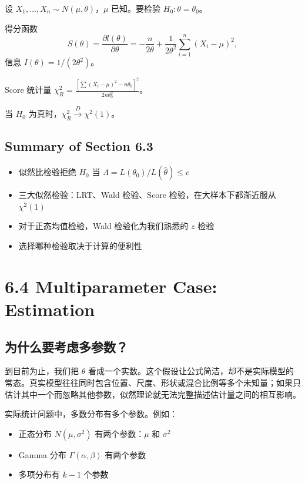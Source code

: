\begin{example}\label{ex:normal-variance-score}
设 $X_1, \ldots, X_n \sim N(\mu, \theta)$，$\mu$ 已知。要检验 $H_0: \theta = \theta_0$。

得分函数
\[
S(\theta)=\frac{\partial l(\theta)}{\partial \theta}
= -\frac{n}{2\theta}+\frac{1}{2\theta^2}\sum_{i=1}^n (X_i-\mu)^2,
\]
信息 $I(\theta)=1/(2\theta^2)$。

Score 统计量 $\chi_R^2 = \frac{[\sum(X_i-\mu)^2 - n\theta_0]^2}{2n\theta_0^2}$。

当 $H_0$ 为真时，$\chi_R^2 \xrightarrow{D} \chi^2(1)$。
\end{example}

\subsection{Summary of Section 6.3}

\begin{itemize}
\item 似然比检验拒绝 $H_0$ 当 $\Lambda = L(\theta_0)/L(\widehat{\theta}) \leq c$
\item 三大似然检验：LRT、Wald 检验、Score 检验，在大样本下都渐近服从 $\chi^2(1)$
\item 对于正态均值检验，Wald 检验化为我们熟悉的 $z$ 检验
\item 选择哪种检验取决于计算的便利性
\end{itemize}

\section{6.4 Multiparameter Case: Estimation}\label{sec:6.4}

\subsection{为什么要考虑多参数？}

到目前为止，我们把 $\theta$ 看成一个实数。这个假设让公式简洁，却不是实际模型的常态。真实模型往往同时包含位置、尺度、形状或混合比例等多个未知量；如果只估计其中一个而忽略其他参数，似然理论就无法完整描述估计量之间的相互影响。

实际统计问题中，多数分布有多个参数。例如：

\begin{itemize}
\item 正态分布 $N(\mu, \sigma^2)$ 有两个参数：$\mu$ 和 $\sigma^2$
\item Gamma 分布 $\Gamma(\alpha, \beta)$ 有两个参数
\item 多项分布有 $k-1$ 个参数
\end{itemize}


